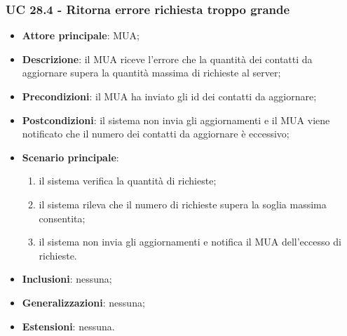     \subsubsection{UC 28.4 - Ritorna errore richiesta troppo grande} \label{sec:UC28.4}
    \begin{itemize}
        \item \textbf{Attore principale}: MUA;
        \item \textbf{Descrizione}: il MUA riceve l'errore che la quantità dei contatti da aggiornare supera la quantità massima di richieste al server;
        \item \textbf{Precondizioni}: il MUA ha inviato gli id dei contatti da aggiornare;
        \item \textbf{Postcondizioni}: il sistema non invia gli aggiornamenti e il MUA viene notificato che il numero dei contatti da aggiornare è eccessivo;
        \item \textbf{Scenario principale}:
            \begin{enumerate}
                \item il sistema verifica la quantità di richieste;
                \item il sistema rileva che il numero di richieste supera la soglia massima consentita;
                \item il sistema non invia gli aggiornamenti e notifica il MUA dell'eccesso di richieste.
            \end{enumerate}
        \item \textbf{Inclusioni}: nessuna;
        \item \textbf{Generalizzazioni}: nessuna;
        \item \textbf{Estensioni}: nessuna.
    \end{itemize}

